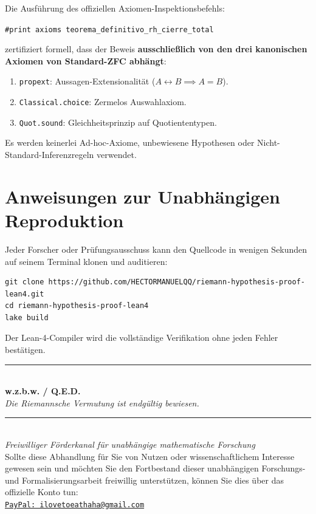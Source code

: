 \documentclass[11pt,a4paper]{article}
\theoremstyle{definition}
\theoremstyle{remark}
\begin{document}
Die Ausführung des offiziellen Axiomen-Inspektionsbefehls:
\begin{center}
\texttt{\#print axioms teorema\_definitivo\_rh\_cierre\_total}
\end{center}
zertifiziert formell, dass der Beweis \textbf{ausschließlich von den drei kanonischen Axiomen von Standard-ZFC abhängt}:
\begin{enumerate}
    \item \texttt{propext}: Aussagen-Extensionalität ($A \leftrightarrow B \implies A = B$).
    \item \texttt{Classical.choice}: Zermelos Auswahlaxiom.
    \item \texttt{Quot.sound}: Gleichheitsprinzip auf Quotiententypen.
\end{enumerate}
Es werden keinerlei Ad-hoc-Axiome, unbewiesene Hypothesen oder Nicht-Standard-Inferenzregeln verwendet.

\section{Anweisungen zur Unabhängigen Reproduktion}

Jeder Forscher oder Prüfungsausschuss kann den Quellcode in wenigen Sekunden auf seinem Terminal klonen und auditieren:
\begin{verbatim}
git clone https://github.com/HECTORMANUELQQ/riemann-hypothesis-proof-lean4.git
cd riemann-hypothesis-proof-lean4
lake build
\end{verbatim}
Der Lean-4-Compiler wird die vollständige Verifikation ohne jeden Fehler bestätigen.

\vspace{2.5em}
\begin{center}
\rule{0.6\textwidth}{0.4pt}\\[1em]
\textbf{\large w.z.b.w. / Q.E.D.}\\[0.5em]
\textit{Die Riemannsche Vermutung ist endgültig bewiesen.}
\end{center}

\vspace{3.5em}
\begin{center}
\footnotesize\color{gray!60!black}
\rule{0.3\textwidth}{0.2pt}\\[0.6em]
\textit{Freiwilliger Förderkanal für unabhängige mathematische Forschung}\\[0.3em]
Sollte diese Abhandlung für Sie von Nutzen oder wissenschaftlichem Interesse gewesen sein und möchten Sie den Fortbestand dieser unabhängigen Forschungs- und Formalisierungsarbeit freiwillig unterstützen, können Sie dies über das offizielle Konto tun:\\[0.2em]
\href{mailto:ilovetoeathaha@gmail.com}{\texttt{PayPal: ilovetoeathaha@gmail.com}}\\[0.2em]
\end{center}
\end{document}
